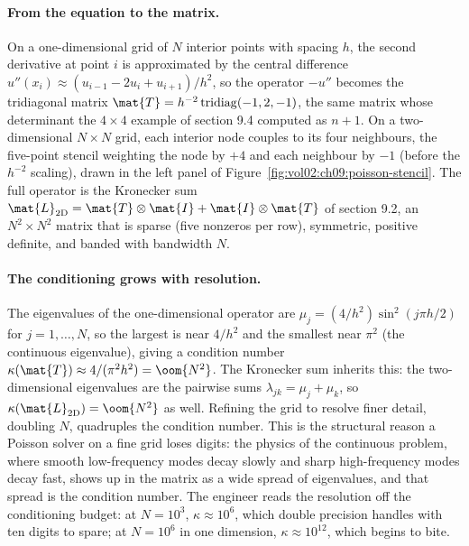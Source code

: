 \paragraph{From the equation to the matrix.}
On a one-dimensional grid of $N$ interior points with spacing $h$, the
second derivative at point $i$ is approximated by the central difference
$u''(x_{i}) \approx (u_{i-1} - 2u_{i} + u_{i+1})/h^{2}$, so the operator
$-u''$ becomes the tridiagonal matrix $\mat{T} = h^{-2}\,
\mathrm{tridiag}(-1, 2, -1)$, the same matrix whose determinant the
$4 \times 4$ example of section 9.4 computed as $n + 1$. On a
two-dimensional $N \times N$ grid, each interior node couples to its
four neighbours, the five-point stencil weighting the node by $+4$ and
each neighbour by $-1$ (before the $h^{-2}$ scaling), drawn in the left
panel of Figure~\ref{fig:vol02:ch09:poisson-stencil}. The full operator
is the Kronecker sum $\mat{L}_{2\mathrm{D}} = \mat{T} \otimes \mat{I} +
\mat{I} \otimes \mat{T}$ of section 9.2, an $N^{2} \times N^{2}$ matrix
that is sparse (five nonzeros per row), symmetric, positive definite,
and banded with bandwidth $N$.



\paragraph{The conditioning grows with resolution.}
The eigenvalues of the one-dimensional operator are $\mu_{j} =
(4/h^{2})\sin^{2}(j\pi h/2)$ for $j = 1, \ldots, N$, so the largest is
near $4/h^{2}$ and the smallest near $\pi^{2}$ (the continuous
eigenvalue), giving a condition number $\kappa(\mat{T}) \approx
4/(\pi^{2}h^{2}) = \oom{N^{2}}$. The Kronecker sum inherits this: the
two-dimensional eigenvalues are the pairwise sums $\lambda_{jk} = \mu_{j}
+ \mu_{k}$, so $\kappa(\mat{L}_{2\mathrm{D}}) = \oom{N^{2}}$ as well.
Refining the grid to resolve finer detail, doubling $N$, quadruples the
condition number. This is the structural reason a Poisson solver on a
fine grid loses digits: the physics of the continuous problem, where
smooth low-frequency modes decay slowly and sharp high-frequency modes
decay fast, shows up in the matrix as a wide spread of eigenvalues, and
that spread is the condition number. The engineer reads the resolution
off the conditioning budget: at $N = 10^{3}$, $\kappa \approx 10^{6}$,
which double precision handles with ten digits to spare; at $N = 10^{6}$
in one dimension, $\kappa \approx 10^{12}$, which begins to bite.

